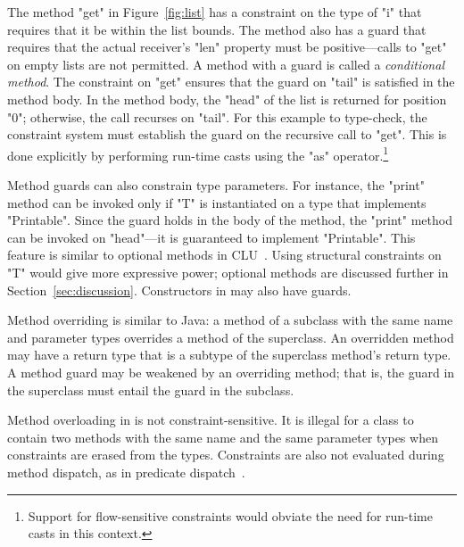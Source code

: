 The method \xcd"get" in Figure~\ref{fig:list}
has a constraint on the type of \xcd"i" that requires
that it be within the list bounds.
The method also has a guard that
requires that the actual
receiver's
\xcd"len" property must be positive---calls to \xcd"get" on empty
lists are not permitted.
A method with a guard is called a \emph{conditional method}.
The constraint on \xcd"get" ensures that the guard on 
\xcd"tail" is satisfied in the method body.
In the method body, the \xcd"head" of the list is returned for
position \xcd"0"; otherwise, the call recurses on \xcd"tail".
For this example to type-check, the constraint system
must establish
the guard on the recursive call to \xcd"get".
This is done explicitly by performing run-time casts using the
\xcd"as" operator.\footnote{Support for flow-sensitive constraints
would obviate the need for
run-time casts in this context.}

Method guards can also constrain type parameters.
For instance, the \xcd"print" method can be invoked only if
\xcd"T" is instantiated on a type that implements
\xcd"Printable".  Since the guard holds in the body of the
method, the \xcd"print" method can be invoked on \xcd"head"---it
is guaranteed to implement \xcd"Printable".
This feature is similar to optional methods in CLU~\cite{clu}.
Using structural constraints on \xcd"T" would give more
expressive power; optional methods are discussed further in
Section~\ref{sec:discussion}.
Constructors in \Xten may also have guards.

Method overriding is similar to Java: a method of a subclass
with the same name and parameter types overrides a method of the
superclass.  An overridden method may have a return type that is
a subtype of the superclass method's return type.
A method guard may be weakened by an overriding
method; that is, the guard in the superclass must entail the  
guard in the subclass.

Method overloading in \Xten is not constraint-sensitive.  It is
illegal for a class to contain two methods with the same name
and the same parameter types when constraints are erased from the 
types.  Constraints are also not evaluated during method
dispatch, as in predicate dispatch~\cite{jpred}.

